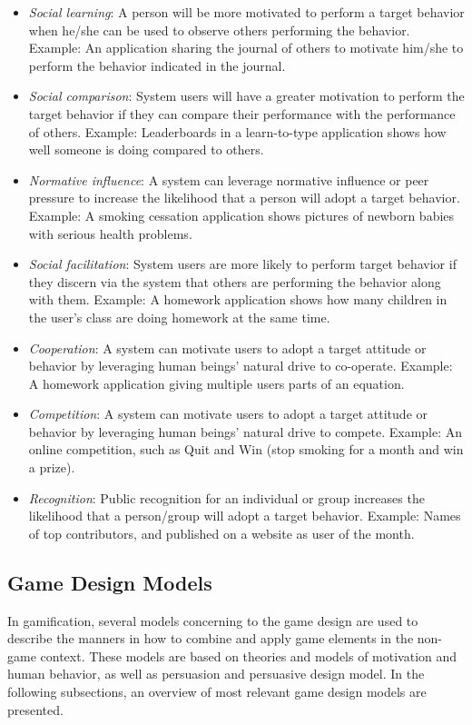 \begin{itemize}
\item \emph{Social learning}: A person will be more motivated to perform a target behavior when he/she can be used to observe others performing the behavior.
Example: An application sharing the journal of others to motivate him/she to perform the behavior indicated in the journal.
\item \emph{Social comparison}: System users will have a greater motivation to perform the target behavior if they can compare their performance with the performance of others.
Example: Leaderboards in a learn-to-type application shows how well someone is doing compared to others.
\item \emph{Normative influence}: A system can leverage normative influence or peer pressure to increase the likelihood that a person will adopt a target behavior.
Example: A smoking cessation application shows pictures of newborn babies with serious health problems.
\item \emph{Social facilitation}: System users are more likely to perform target behavior if they discern via the system that others are performing the behavior along with them.
Example: A homework application shows how many children in the
user's class are doing homework at the same time.
\item \emph{Cooperation}: A system can motivate users to adopt a target attitude or behavior by leveraging human beings' natural drive to co-operate.
Example: A homework application giving multiple users parts of an equation.
\item \emph{Competition}: A system can motivate users to adopt a target attitude or behavior by leveraging human beings' natural drive to compete.
Example: An online competition, such as Quit and Win (stop smoking for a month and win a prize).
\item \emph{Recognition}: Public recognition for an individual or group increases the likelihood that a person/group will adopt a target behavior.
Example: Names of top contributors, and published on a website as user of the month.
\end{itemize}
 
\subsection{Game Design Models}
\label{subsec:game-design-models}

In gamification, several models concerning to the game design are used to describe the manners in how to combine and apply game elements in the non-game context. These models are based on  theories and models of motivation and human behavior, as well as persuasion and persuasive design model. In the following subsections, an overview of most relevant game design models are presented.

